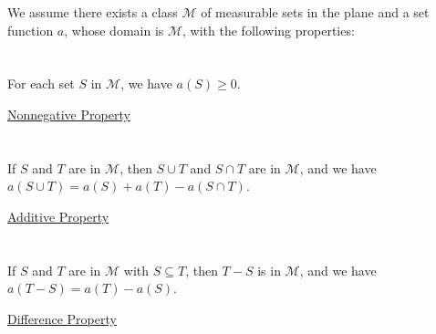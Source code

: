 \documentclass{article}
\newcommand{\lean}[2]{\href{./Area.html\##1}{#2}}
\begin{document}

We assume there exists a class $\mathscr{M}$ of measurable sets in the plane and
  a set function $a$, whose domain is $\mathscr{M}$, with the following
  properties:

\section*{}%
%

For each set $S$ in $\mathscr{M}$, we have $a(S) \geq 0$.

\begin{axiom}

  \lean{Nonnegative-Property}{Nonnegative Property}

\end{axiom}

\section*{}%
%

If $S$ and $T$ are in $\mathscr{M}$, then $S \cup T$ and $S \cap T$ are in
  $\mathscr{M}$, and we have $a(S \cup T) = a(S) + a(T) - a(S \cap T)$.

\begin{axiom}

  \lean{Additive-Property}{Additive Property}

\end{axiom}

\section*{}%
%

If $S$ and $T$ are in $\mathscr{M}$ with $S \subseteq T$, then $T - S$ is in
  $\mathscr{M}$, and we have $a(T - S) = a(T) - a(S)$.

\begin{axiom}

  \lean{Difference-Property}{Difference Property}

\end{axiom}

\section*{}%
%
\end{document}
